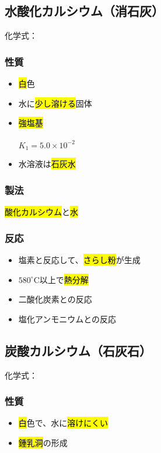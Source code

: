 \subsection{水酸化カルシウム（消石灰）}
化学式：\hl{}
\subsubsection{性質}
\begin{itemize}
  \item \hl{白}色
  \item 水に\hl{少し溶ける}固体
  \item \hl{強塩基}\\
        \hl{} \\
        \hfill $K_{1}=5.0\times10^{-2}$
  \item 水溶液は\hl{石灰水}
\end{itemize}
\subsubsection{製法}
\hl{酸化カルシウム}と\hl{水} \K\\
\subsubsection{反応}
\begin{itemize}
  \item 塩素と反応して、\hl{さらし粉}が生成\\
  \item $580^{\circ}$C以上で\hl{熱分解}\\
  \item 二酸化炭素との反応\\
  \item 塩化アンモニウムとの反応\\
\end{itemize}
\newpage
\subsection{炭酸カルシウム（石灰石）}
化学式：\hl{}
\subsubsection{性質}
\begin{itemize}
  \item \hl{白}色で、水に\hl{溶けにくい}
  \item \hl{鍾乳洞}の形成
\end{itemize}
